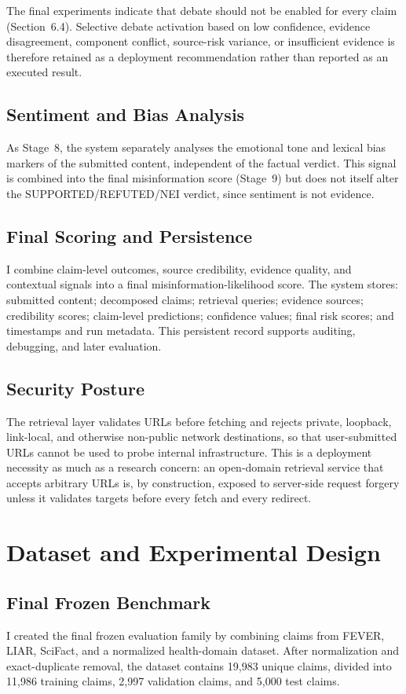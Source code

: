 \documentclass[12pt,a4paper,openany]{report}
\begin{document}
The final experiments indicate that debate should not be enabled for every claim (Section~6.4). Selective debate activation based on low confidence, evidence disagreement, component conflict, source-risk variance, or insufficient evidence is therefore retained as a deployment recommendation rather than reported as an executed result.

\section{Sentiment and Bias Analysis}
As Stage~8, the system separately analyses the emotional tone and lexical bias markers of the submitted content, independent of the factual verdict. This signal is combined into the final misinformation score (Stage~9) but does not itself alter the SUPPORTED/REFUTED/NEI verdict, since sentiment is not evidence.

\section{Final Scoring and Persistence}
I combine claim-level outcomes, source credibility, evidence quality, and contextual signals into a final misinformation-likelihood score. The system stores: submitted content; decomposed claims; retrieval queries; evidence sources; credibility scores; claim-level predictions; confidence values; final risk scores; and timestamps and run metadata. This persistent record supports auditing, debugging, and later evaluation.

\section{Security Posture}
The retrieval layer validates URLs before fetching and rejects private, loopback, link-local, and otherwise non-public network destinations, so that user-submitted URLs cannot be used to probe internal infrastructure. This is a deployment necessity as much as a research concern: an open-domain retrieval service that accepts arbitrary URLs is, by construction, exposed to server-side request forgery unless it validates targets before every fetch and every redirect.

\chapter{Dataset and Experimental Design}
\section{Final Frozen Benchmark}
I created the final frozen evaluation family by combining claims from FEVER, LIAR, SciFact, and a normalized health-domain dataset. After normalization and exact-duplicate removal, the dataset contains 19{,}983 unique claims, divided into 11{,}986 training claims, 2{,}997 validation claims, and 5{,}000 test claims.
\end{document}

